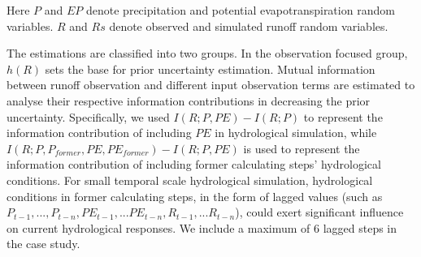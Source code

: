 \documentclass[draft,wrr]{AGUTeX}
\begin{document}
\begin{article}

Here $P$ and $EP$ denote precipitation and potential evapotranspiration random variables. $R$ and $Rs$ denote observed and simulated runoff random variables. 

The estimations are classified into two groups. In the observation focused group, $h(R)$ sets the base for prior uncertainty estimation. Mutual information between runoff observation and different input observation terms are estimated to analyse their respective information contributions in decreasing the prior uncertainty. Specifically, we used $I(R;P,PE)-I(R;P)$ to represent the information contribution of including $PE$ in hydrological simulation, while $I(R;P,P_{former},PE,PE_{former})-I(R;P,PE)$ is used to represent the information contribution of including  former calculating steps' hydrological conditions. For small temporal scale hydrological simulation, hydrological conditions in former calculating steps, in the form of lagged values (such as $P_{t-1},...,P_{t-n},PE_{t-1},...PE_{t-n},R_{t-1},...R_{t-n}$), could exert significant influence on current hydrological responses. We include a maximum of 6 lagged steps in the case study.     


\end{article}
\end{document}
